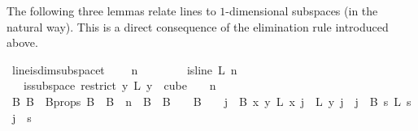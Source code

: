 \begin{isabellebody}
{\isafoldproof}%
%
\isadelimproof
%
\endisadelimproof
%
\begin{isamarkuptext}%
The following three lemmas relate lines to $1$-dimensional subspaces (in the natural way). This is a direct consequence of the elimination rule  introduced above.%
\end{isamarkuptext}\isamarkuptrue%
\isamarkupfalse%
\ line{\isacharunderscore}{\kern0pt}is{\isacharunderscore}{\kern0pt}dim{}{\isacharunderscore}{\kern0pt}subspace{\isacharunderscore}{\kern0pt}t{\isacharunderscore}{\kern0pt}{}{\isacharcolon}{\kern0pt}\ \isanewline
\ \ \ {\isachardoublequoteopen}n\ {\isachargreater}{\kern0pt}\ {}{\isachardoublequoteclose}\ \isanewline
\ \ \ \ \ {\isachardoublequoteopen}is{\isacharunderscore}{\kern0pt}line\ L\ n\ {}{\isachardoublequoteclose}\isanewline
\ \ \ {\isachardoublequoteopen}is{\isacharunderscore}{\kern0pt}subspace\ {\isacharparenleft}{\kern0pt}restrict\ {\isacharparenleft}{\kern0pt}{\isasymlambda}y{\isachardot}{\kern0pt}\ L\ {\isacharparenleft}{\kern0pt}y\ {}{\isacharparenright}{\kern0pt}{\isacharparenright}{\kern0pt}\ {\isacharparenleft}{\kern0pt}cube\ {}\ {}{\isacharparenright}{\kern0pt}{\isacharparenright}{\kern0pt}\ {}\ n\ {}{\isachardoublequoteclose}\isanewline
%
\isadelimproof
%
\endisadelimproof
%
\isatagproof
{}\isamarkupfalse%
\ {\isacharminus}{\kern0pt}\isanewline
\ \ \isamarkupfalse%
\ B\ B\ \ B{\isacharunderscore}{\kern0pt}props{\isacharcolon}{\kern0pt}\ {\isachardoublequoteopen}B\ {\isasymunion}\ B\ {\isacharequal}{\kern0pt}\ {\isacharbraceleft}{\kern0pt}{\isachardot}{\kern0pt}{\isachardot}{\kern0pt}{\isacharless}{\kern0pt}n{\isacharbraceright}{\kern0pt}\ {\isasymand}\ B\ {\isasyminter}\ B\ {\isacharequal}{\kern0pt}\ {\isacharbraceleft}{\kern0pt}{\isacharbraceright}{\kern0pt}\ {\isasymand}\ B\ {\isasymnoteq}\ {\isacharbraceleft}{\kern0pt}{\isacharbraceright}{\kern0pt}\ {\isasymand}\ {\isacharparenleft}{\kern0pt}{\isasymforall}j\ {\isasymin}\ B\ {\isacharparenleft}{\kern0pt}{\isasymforall}x{\isacharless}{\kern0pt}{}{\isachardot}{\kern0pt}\ {\isasymforall}y{\isacharless}{\kern0pt}{}{\isachardot}{\kern0pt}\ L\ x\ j\ {\isacharequal}{\kern0pt}\ L\ y\ j{\isacharparenright}{\kern0pt}{\isacharparenright}{\kern0pt}\ {\isasymand}\ {\isacharparenleft}{\kern0pt}{\isasymforall}j\ {\isasymin}\ B\ {\isacharparenleft}{\kern0pt}{\isasymforall}s{\isacharless}{\kern0pt}{}{\isachardot}{\kern0pt}\ L\ s\ j\ {\isacharequal}{\kern0pt}\ s{\isacharparenright}{\kern0pt}{\isacharparenright}{\kern0pt}{\isachardoublequoteclose}\ \isamarkupfalse%

\end{isabellebody}
